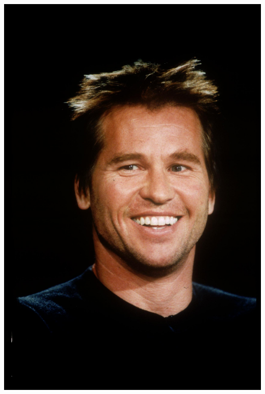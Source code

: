 \documentclass{beamer}
\begin{document}
\begin{frame}[fragile]
\begin{itemize}
\includegraphics[height=0.3\textheight]{val.jpg}
\end{itemize}
\end{frame}
\end{document}
